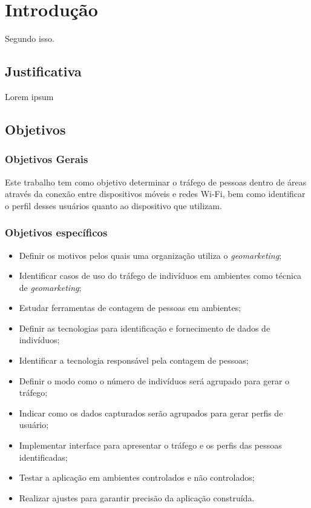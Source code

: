 
\chapter{Introdução}
\label{introducao}

Segundo  isso.

\section{Justificativa}
\label{justificativa}

Lorem ipsum

\section{Objetivos}
\label{objetivos}

\subsection{Objetivos Gerais}
Este trabalho tem como objetivo determinar o tráfego de pessoas dentro de áreas através da conexão entre dispositivos móveis e redes
Wi-Fi, bem como identificar o perfil desses usuários quanto ao dispositivo que utilizam.

\subsection{Objetivos específicos}
\begin{itemize}
  \item Definir os motivos pelos quais uma organização utiliza o \emph{geomarketing};
  \item Identificar casos de uso do tráfego de indivíduos em ambientes como técnica
  de \emph{geomarketing};
  \item Estudar ferramentas de contagem de pessoas em ambientes;
  \item Definir as tecnologias para identificação e fornecimento de dados de indivíduos;
  \item Identificar a tecnologia responsável pela contagem de pessoas;
  \item Definir o modo como o número de indivíduos será agrupado para gerar o tráfego;
  \item Indicar como os dados capturados serão agrupados para gerar perfis de usuário;
  \item Implementar interface para apresentar o tráfego e os perfis das pessoas identificadas;
  \item Testar a aplicação em ambientes controlados e não controlados;
  \item Realizar ajustes para garantir precisão da aplicação construída.
\end{itemize}
